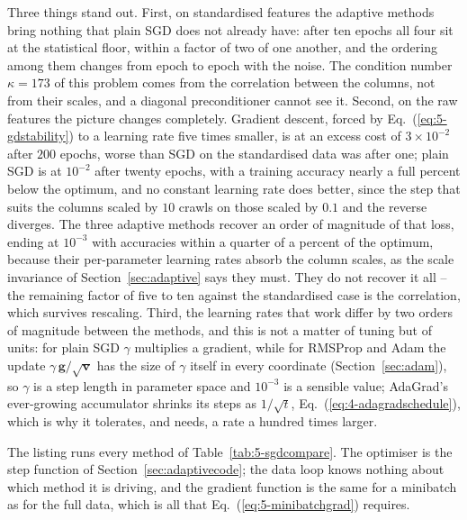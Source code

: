 Three things stand out.  First, on standardised features the adaptive
methods bring nothing that plain SGD does not already have: after ten
epochs all four sit at the statistical floor, within a factor of two of
one another, and the ordering among them changes from epoch to epoch with
the noise.  The condition number $\kappa=173$ of this problem comes from the
correlation between the columns, not from their scales, and a diagonal
preconditioner cannot see it.  Second, on the raw features the picture
changes completely.  Gradient descent, forced by Eq.~(\ref{eq:5-gdstability})
to a learning rate five times smaller, is at an excess cost of
$3\times10^{-2}$ after $200$ epochs, worse than SGD on the standardised
data was after one; plain SGD is at $10^{-2}$ after twenty epochs, with a
training accuracy nearly a full percent below the optimum, and no constant learning
rate does better, since the step that suits the columns scaled by $10$
crawls on those scaled by $0.1$ and the reverse diverges.  The three
adaptive methods recover an order of magnitude of that loss, ending at
$10^{-3}$ with accuracies within a quarter of a percent of the optimum, because their
per-parameter learning rates absorb the column scales, as the scale
invariance of Section~\ref{sec:adaptive} says they must.  They do not
recover it all -- the remaining factor of five to ten against the
standardised case is the correlation, which survives rescaling.  Third, the
learning rates that work differ by two orders of magnitude between the
methods, and this is not a matter of tuning but of units: for plain SGD
$\gamma$ multiplies a gradient, while for RMSProp and Adam the update
$\gamma\,\bm{g}/\sqrt{\bm{v}}$ has the size of $\gamma$ itself in every
coordinate (Section~\ref{sec:adam}), so $\gamma$ is a step length in
parameter space and $10^{-3}$ is a sensible value; AdaGrad's ever-growing
accumulator shrinks its steps as $1/\sqrt{t}$, Eq.~(\ref{eq:4-adagradschedule}),
which is why it tolerates, and needs, a rate a hundred times larger.

The listing runs every method of Table~\ref{tab:5-sgdcompare}.  The
optimiser is the step function of Section~\ref{sec:adaptivecode}; the data
loop knows nothing about which method it is driving, and the gradient
function is the same for a minibatch as for the full data, which is all
that Eq.~(\ref{eq:5-minibatchgrad}) requires.

